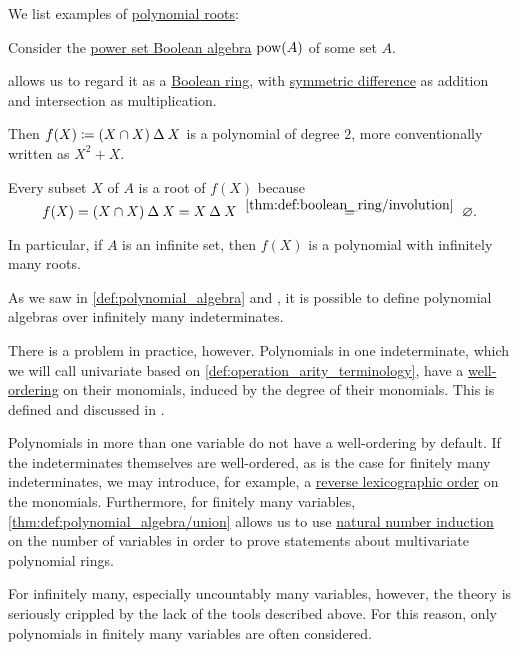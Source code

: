 \begin{example}\label{ex:def:root_of_polynomial}
  We list examples of \hyperref[def:root_of_polynomial]{polynomial roots}:
  \begin{thmenum}
     Consider the \hyperref[thm:boolean_algebra_of_subsets]{power set Boolean algebra} \( \operatorname{pow}(A) \) of some set \( A \).

     allows us to regard it as a \hyperref[def:boolean_ring]{Boolean ring}, with \hyperref[def:symmetric_difference]{symmetric difference} as addition and intersection as multiplication.

    Then \( f(X) \coloneqq (X \cap X) \mathbin \Delta X \) is a polynomial of degree \( 2 \), more conventionally written as \( X^2 + X \).

    Every subset \( X \) of \( A \) is a root of \( f(X) \) because
    \begin{equation*}
      f(X) = (X \cap X) \symdiff X = X \symdiff X
      \reloset {\ref{thm:def:boolean_ring/involution}} =
      \varnothing.
    \end{equation*}

    In particular, if \( A \) is an infinite set, then \( f(X) \) is a polynomial with infinitely many roots.
  \end{thmenum}
\end{example}

\begin{remark}\label{rem:polynomials_over_infinitely_many_indeterminates}
  As we saw in \cref{def:polynomial_algebra} and , it is possible to define polynomial algebras over infinitely many indeterminates.

  There is a problem in practice, however. Polynomials in one indeterminate, which we will call univariate based on \cref{def:operation_arity_terminology}, have a \hyperref[def:well_ordered_set]{well-ordering} on their monomials, induced by the degree of their monomials. This is defined and discussed in .

  Polynomials in more than one variable do not have a well-ordering by default. If the indeterminates themselves are well-ordered, as is the case for finitely many indeterminates, we may introduce, for example, a \hyperref[def:lexicographic_order]{reverse lexicographic order} on the monomials. Furthermore, for finitely many variables, \cref{thm:def:polynomial_algebra/union} allows us to use \hyperref[con:induction/peano_arithmetic]{natural number induction} on the number of variables in order to prove statements about multivariate polynomial rings.

  For infinitely many, especially uncountably many variables, however, the theory is seriously crippled by the lack of the tools described above. For this reason, only polynomials in finitely many variables are often considered.
\end{remark}

